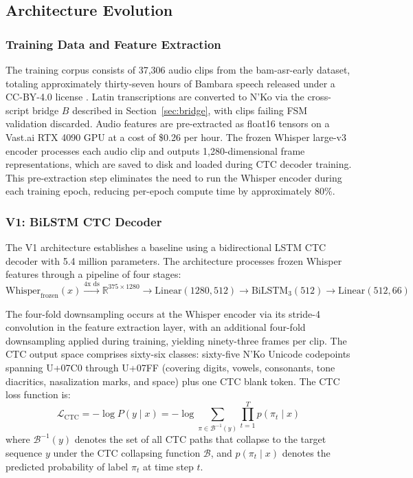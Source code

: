 \documentclass[11pt]{article}
\newcommand{\nko}{N'Ko}
\begin{document}
\subsection{Architecture Evolution}
\label{sec:architecture}

\subsubsection{Training Data and Feature Extraction}

The training corpus consists of 37,306 audio clips from the bam-asr-early dataset, totaling approximately thirty-seven hours of Bambara speech released under a CC-BY-4.0 license \cite{robotsmali2024}. Latin transcriptions are converted to \nko{} via the cross-script bridge $B$ described in Section~\ref{sec:bridge}, with clips failing FSM validation discarded. Audio features are pre-extracted as float16 tensors on a Vast.ai RTX 4090 GPU at a cost of \$0.26 per hour. The frozen Whisper large-v3 encoder processes each audio clip and outputs 1,280-dimensional frame representations, which are saved to disk and loaded during CTC decoder training. This pre-extraction step eliminates the need to run the Whisper encoder during each training epoch, reducing per-epoch compute time by approximately 80\%.

\subsubsection{V1: BiLSTM CTC Decoder}

The V1 architecture establishes a baseline using a bidirectional LSTM CTC decoder with 5.4 million parameters. The architecture processes frozen Whisper features through a pipeline of four stages:
\begin{equation}
\text{Whisper}_{\text{frozen}}(x) \xrightarrow{\text{4x ds}} \mathbb{R}^{375 \times 1280} \to \text{Linear}(1280, 512) \to \text{BiLSTM}_3(512) \to \text{Linear}(512, 66)
\label{eq:v1}
\end{equation}

The four-fold downsampling occurs at the Whisper encoder via its stride-4 convolution in the feature extraction layer, with an additional four-fold downsampling applied during training, yielding ninety-three frames per clip. The CTC output space comprises sixty-six classes: sixty-five \nko{} Unicode codepoints spanning U+07C0 through U+07FF (covering digits, vowels, consonants, tone diacritics, nasalization marks, and space) plus one CTC blank token. The CTC loss function is:
\begin{equation}
\mathcal{L}_{\text{CTC}} = -\log P(y \mid x) = -\log \sum_{\pi \in \mathcal{B}^{-1}(y)} \prod_{t=1}^{T} p(\pi_t \mid x)
\label{eq:ctc}
\end{equation}
where $\mathcal{B}^{-1}(y)$ denotes the set of all CTC paths that collapse to the target sequence $y$ under the CTC collapsing function $\mathcal{B}$, and $p(\pi_t \mid x)$ denotes the predicted probability of label $\pi_t$ at time step $t$.
\end{document}
